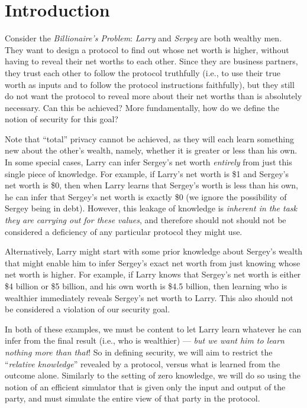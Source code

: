\documentclass[11pt]{article}
\begin{document}
\thispagestyle{fancy} %


\section{Introduction}

Consider the {\em Billionaire's Problem}: {\em Larry} and {\em Sergey}
are both wealthy men.  They want to design a protocol to find out
whose net worth is higher, without having to reveal their net worths
to each other.  Since they are business partners, they trust each
other to follow the protocol truthfully (i.e., to use their true worth
as inputs and to follow the protocol instructions faithfully), but
they still do not want the protocol to reveal more about their net
worths than is absolutely necessary.  Can this be achieved?  More
fundamentally, how do we define the notion of security for this goal?

Note that ``total'' privacy cannot be achieved, as they will each
learn something new about the other's wealth, namely, whether it is
greater or less than his own.  In some special cases, Larry can infer
Sergey's net worth \emph{entirely} from just this single piece of
knowledge.  For example, if Larry's net worth is \$1 and Sergey's net
worth is \$0, then when Larry learns that Sergey's worth is less than
his own, he can infer that Sergey's net worth is exactly \$0 (we
ignore the possibility of Sergey being in debt).  However, this
leakage of knowledge is \emph{inherent in the task they are carrying
  out for these values}, and therefore should not should not be
considered a deficiency of any particular protocol they might use.

Alternatively, Larry might start with some prior knowledge about
Sergey's wealth that might enable him to infer Sergey's exact net
worth from just knowing whose net worth is higher.  For example, if
Larry knows that Sergey's net worth is either \$4 billion or \$5
billion, and his own worth is \$4.5 billion, then learning who is
wealthier immediately reveals Sergey's net worth to Larry.  This also
should not be considered a violation of our security goal.

In both of these examples, we must be content to let Larry learn
whatever he can infer from the final result (i.e., who is wealthier)
--- \emph{but we want him to learn nothing more than that}!  So in
defining security, we will aim to restrict the ``\emph{relative
  knowledge}'' revealed by a protocol, versus what is learned from the
outcome alone.  Similarly to the setting of zero knowledge, we will do
so using the notion of an efficient simulator that is given only the
input and output of the party, and must simulate the entire view of
that party in the protocol.
\end{document}
